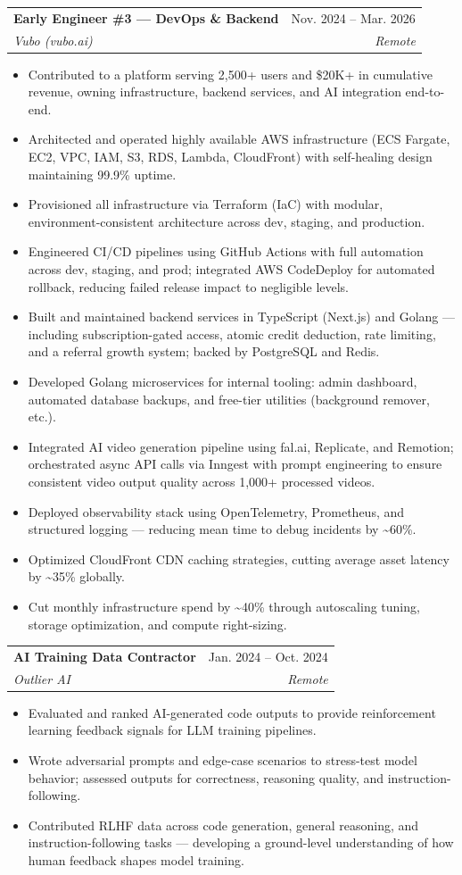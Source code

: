 \documentclass[letterpaper,11pt]{article}
\makeatletter
\newcommand{\resumeItem}[1]{
  \item\small{{#1 \vspace{-2pt}}}
}
\newcommand{\resumeSubheading}[4]{
  \vspace{-2pt}\item
    \begin{tabular*}{0.97\textwidth}[t]{l@{\extracolsep{\fill}}r}
      \textbf{#1} & #2 \\
      \textit{\small#3} & \textit{\small #4} \\
    \end{tabular*}\vspace{-7pt}
}
\newcommand{\resumeItemListStart}{\begin{itemize}}
\newcommand{\resumeItemListEnd}{\end{itemize}\vspace{-5pt}}
\makeatother
\begin{document}
\resumeSubheading
{Early Engineer \#3 --- DevOps \& Backend}{Nov. 2024 -- Mar. 2026}
{Vubo (vubo.ai)}{Remote}
\resumeItemListStart
\resumeItem{Contributed to a platform serving 2,500+ users and \$20K+ in cumulative revenue, owning infrastructure, backend services, and AI integration end-to-end.}
\resumeItem{Architected and operated highly available AWS infrastructure (ECS Fargate, EC2, VPC, IAM, S3, RDS, Lambda, CloudFront) with self-healing design maintaining 99.9\% uptime.}
\resumeItem{Provisioned all infrastructure via Terraform (IaC) with modular, environment-consistent architecture across dev, staging, and production.}
\resumeItem{Engineered CI/CD pipelines using GitHub Actions with full automation across dev, staging, and prod; integrated AWS CodeDeploy for automated rollback, reducing failed release impact to negligible levels.}
\resumeItem{Built and maintained backend services in TypeScript (Next.js) and Golang --- including subscription-gated access, atomic credit deduction, rate limiting, and a referral growth system; backed by PostgreSQL and Redis.}
\resumeItem{Developed Golang microservices for internal tooling: admin dashboard, automated database backups, and free-tier utilities (background remover, etc.).}
\resumeItem{Integrated AI video generation pipeline using fal.ai, Replicate, and Remotion; orchestrated async API calls via Inngest with prompt engineering to ensure consistent video output quality across 1,000+ processed videos.}
\resumeItem{Deployed observability stack using OpenTelemetry, Prometheus, and structured logging --- reducing mean time to debug incidents by \textasciitilde60\%.}
\resumeItem{Optimized CloudFront CDN caching strategies, cutting average asset latency by \textasciitilde35\% globally.}
\resumeItem{Cut monthly infrastructure spend by \textasciitilde40\% through autoscaling tuning, storage optimization, and compute right-sizing.}
\resumeItemListEnd

\resumeSubheading
{AI Training Data Contractor}{Jan. 2024 -- Oct. 2024}
{Outlier AI}{Remote}
\resumeItemListStart
\resumeItem{Evaluated and ranked AI-generated code outputs to provide reinforcement learning feedback signals for LLM training pipelines.}
\resumeItem{Wrote adversarial prompts and edge-case scenarios to stress-test model behavior; assessed outputs for correctness, reasoning quality, and instruction-following.}
\resumeItem{Contributed RLHF data across code generation, general reasoning, and instruction-following tasks --- developing a ground-level understanding of how human feedback shapes model training.}
\resumeItemListEnd
\end{document}
